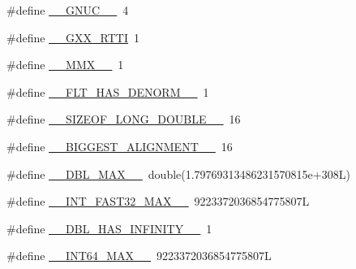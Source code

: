 \begin{DoxyCompactItemize}
\item 
\#define \hyperlink{build-analizer__host-_desktop___qt__5__9__0___g_c_c__64bit-_release_2moc__predefs_8h_aa51016843ec55a0a9df7ce9f85767ee7}{\+\_\+\+\_\+\+G\+N\+U\+C\+\_\+\+\_\+}~4
\item 
\#define \hyperlink{build-analizer__host-_desktop___qt__5__9__0___g_c_c__64bit-_release_2moc__predefs_8h_af607715c8c9a98aa72c81c6629554b0d}{\+\_\+\+\_\+\+G\+X\+X\+\_\+\+R\+T\+T\+I}~1
\item 
\#define \hyperlink{build-analizer__host-_desktop___qt__5__9__0___g_c_c__64bit-_release_2moc__predefs_8h_ab61dd6e368adb90e2eff5739188b0bcb}{\+\_\+\+\_\+\+M\+M\+X\+\_\+\+\_\+}~1
\item 
\#define \hyperlink{build-analizer__host-_desktop___qt__5__9__0___g_c_c__64bit-_release_2moc__predefs_8h_a82a2c3ff271d1685b450975ffa68544a}{\+\_\+\+\_\+\+F\+L\+T\+\_\+\+H\+A\+S\+\_\+\+D\+E\+N\+O\+R\+M\+\_\+\+\_\+}~1
\item 
\#define \hyperlink{build-analizer__host-_desktop___qt__5__9__0___g_c_c__64bit-_release_2moc__predefs_8h_aae92712264b830cd7d24d4b81d502ffb}{\+\_\+\+\_\+\+S\+I\+Z\+E\+O\+F\+\_\+\+L\+O\+N\+G\+\_\+\+D\+O\+U\+B\+L\+E\+\_\+\+\_\+}~16
\item 
\#define \hyperlink{build-analizer__host-_desktop___qt__5__9__0___g_c_c__64bit-_release_2moc__predefs_8h_a2c25ec0f0ae74f9d8a7c373288a28dd1}{\+\_\+\+\_\+\+B\+I\+G\+G\+E\+S\+T\+\_\+\+A\+L\+I\+G\+N\+M\+E\+N\+T\+\_\+\+\_\+}~16
\item 
\#define \hyperlink{build-analizer__host-_desktop___qt__5__9__0___g_c_c__64bit-_release_2moc__predefs_8h_a711d7b7f27671b10b11a74c37f653ad7}{\+\_\+\+\_\+\+D\+B\+L\+\_\+\+M\+A\+X\+\_\+\+\_\+}~double(1.\+79769313486231570815e+308\+L)
\item 
\#define \hyperlink{build-analizer__host-_desktop___qt__5__9__0___g_c_c__64bit-_release_2moc__predefs_8h_a84479d2bbe1d7286f406fcc302f41376}{\+\_\+\+\_\+\+I\+N\+T\+\_\+\+F\+A\+S\+T32\+\_\+\+M\+A\+X\+\_\+\+\_\+}~9223372036854775807\+L
\item 
\#define \hyperlink{build-analizer__host-_desktop___qt__5__9__0___g_c_c__64bit-_release_2moc__predefs_8h_a3dd03066dbb351dfa51353c80a7902a2}{\+\_\+\+\_\+\+D\+B\+L\+\_\+\+H\+A\+S\+\_\+\+I\+N\+F\+I\+N\+I\+T\+Y\+\_\+\+\_\+}~1
\item 
\#define \hyperlink{build-analizer__host-_desktop___qt__5__9__0___g_c_c__64bit-_release_2moc__predefs_8h_aa3f186f612efe5edfcc371c95617f06f}{\+\_\+\+\_\+\+I\+N\+T64\+\_\+\+M\+A\+X\+\_\+\+\_\+}~9223372036854775807\+L
\item 

\end{DoxyCompactItemize}
